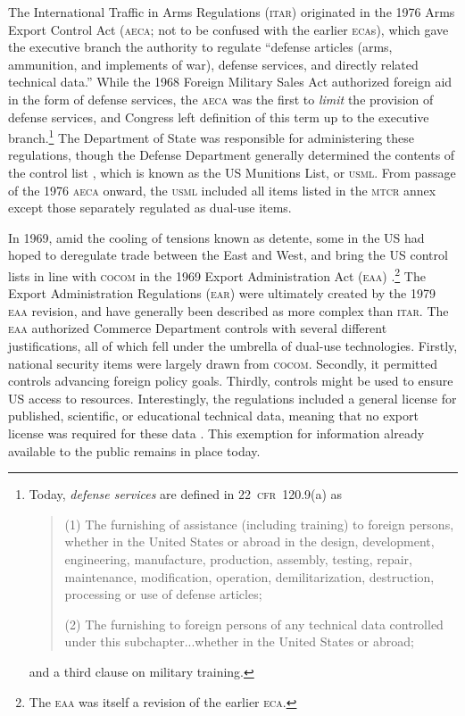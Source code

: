 \documentclass[12pt]{olfmemo}
\begin{document}
The International Traffic in Arms Regulations (\textsc{itar}) originated in the 1976 Arms Export Control Act (\textsc{aeca}; not to be confused with the earlier \textsc{eca}s), which gave the executive branch the authority to regulate ``defense articles (arms, ammunition, and implements of war), defense services, and directly related technical data.'' While the 1968 Foreign Military Sales Act authorized foreign aid in the form of defense services, the \textsc{aeca} was the first to \textit{limit} the provision of defense services, and Congress left definition of this term up to the executive branch.\footnote{Today, \textit{defense services} are defined in 22~\textsc{cfr}~120.9(a) as
\begin{quote}
(1) The furnishing of assistance (including training) to foreign persons, whether in the United States or abroad in the design, development, engineering, manufacture, production, assembly, testing, repair, maintenance, modification, operation, demilitarization, destruction, processing or use of defense articles;

(2) The furnishing to foreign persons of any technical data controlled under this subchapter...whether in the United States or abroad;
\end{quote}
and a third clause on military training.}
The Department of State was responsible for administering these regulations, though the Defense Department generally determined the contents of the control list \citep{NAP1987}, which is known as the US Munitions List, or \textsc{usml}. From passage of the 1976 \textsc{aeca} onward, the \textsc{usml} included all items listed in the \textsc{mtcr} annex except those separately regulated as dual-use items.

In 1969, amid the cooling of tensions known as detente, some in the US had hoped to deregulate trade between the East and West, and bring the US control lists in line with \textsc{cocom} in the 1969 Export Administration Act (\textsc{eaa}) \citep{NAP1987}.\footnote{The \textsc{eaa} was itself a revision of the earlier \textsc{eca}.} The Export Administration Regulations (\textsc{ear}) were ultimately created by the 1979 \textsc{eaa} revision, and have generally been described as more complex than \textsc{itar}. The \textsc{eaa} authorized Commerce Department controls with several different justifications, all of which fell under the umbrella of dual-use technologies. Firstly, national security items were largely drawn from \textsc{cocom}. Secondly, it permitted controls advancing foreign policy goals. Thirdly, controls might be used to ensure US access to resources. Interestingly, the regulations included a general license for published, scientific, or educational technical data, meaning that no export license was required for these data \citep{NAP1987}. This exemption for information already available to the public remains in place today.
\end{document}
